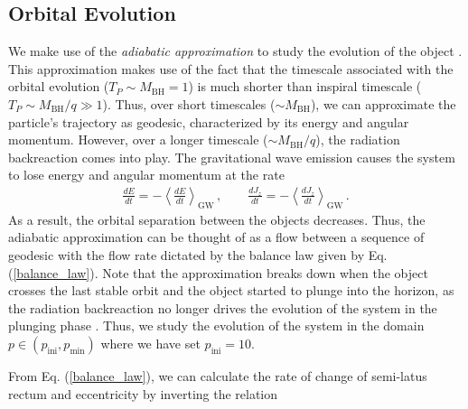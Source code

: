 \documentclass[11pt]{article}
\begin{document}
\subsection{Orbital Evolution}

We make use of the \textit{adiabatic approximation} to study the evolution of the object \cite{PhysRevD.78.064028, PhysRevD.103.104014,Isoyama:2021jjd}. This approximation makes use of the fact that the timescale associated with the orbital evolution ($T_P\sim M_{\textrm{BH}}=1$) is much shorter than inspiral timescale ($T_P\sim M_{\textrm{BH}}/q \gg 1$). Thus, over short timescales ($\sim M_{\textrm{BH}}$), we can approximate the particle's trajectory as geodesic, characterized by its energy and angular momentum. However, over a longer timescale ($\sim M_{\textrm{BH}}/q$), the radiation backreaction comes into play. The gravitational wave emission causes the system to lose energy and angular momentum at the rate \cite{PhysRevD.103.104014} 
\begin{equation}\label{balance_law}
    \begin{aligned}
        \frac{dE}{dt}=-\left\langle\frac{dE}{dt}\right\rangle_{\textrm{GW}}\,,\qquad \frac{dJ_z}{dt}=-\left\langle\frac{dJ_z}{dt}\right\rangle_{\textrm{GW}}\,.
    \end{aligned}
\end{equation}
As a result, the orbital separation between the objects decreases. Thus, the adiabatic approximation can be thought of as a flow between a sequence of geodesic with the flow rate dictated by the balance law given by Eq. (\ref{balance_law}). Note that the approximation breaks down when the object crosses the last stable orbit and  the object started to plunge into the horizon, as the radiation backreaction no longer drives the evolution of the system in the plunging phase \cite{PhysRevD.78.064028}.  Thus, we study the evolution of the system in the domain $p\in (p_{\textrm{ini}}, p_{\textrm{min}})$ where we have set $p_{\textrm{ini}}=10$.\par%
From Eq. (\ref{balance_law}), we can calculate the rate of change of semi-latus rectum and eccentricity by inverting the relation 
\end{document}
